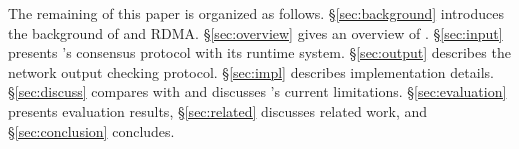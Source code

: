


The remaining of this paper is organized as follows.
\S\ref{sec:background} introduces the background of \paxos and RDMA.
\S\ref{sec:overview} gives an overview of \xxx. \S\ref{sec:input} presents 
\xxx's consensus protocol with its runtime system. \S\ref{sec:output} describes 
the network output checking protocol. \S\ref{sec:impl} describes implementation 
details. \S\ref{sec:discuss} compares \dare with \xxx and discusses \xxx's 
current limitations. \S\ref{sec:evaluation} presents evaluation results, 
\S\ref{sec:related} discusses related work, and \S\ref{sec:conclusion} 
concludes. 

